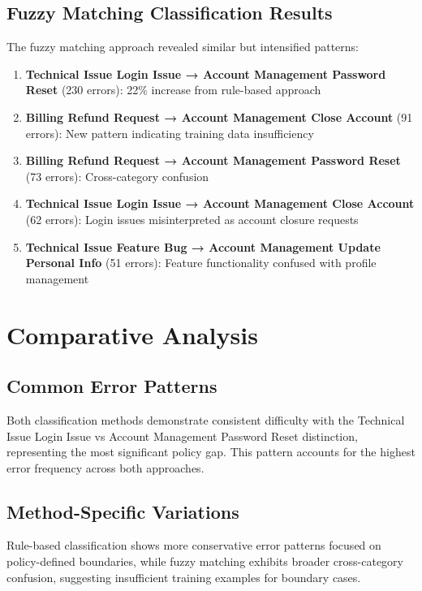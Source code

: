 \documentclass[11pt, a4paper]{article}
\begin{document}
\subsection{Fuzzy Matching Classification Results}

The fuzzy matching approach revealed similar but intensified patterns:

\begin{enumerate}
\item \textbf{Technical Issue Login Issue → Account Management Password Reset} (230 errors): 22\% increase from rule-based approach
\item \textbf{Billing Refund Request → Account Management Close Account} (91 errors): New pattern indicating training data insufficiency
\item \textbf{Billing Refund Request → Account Management Password Reset} (73 errors): Cross-category confusion
\item \textbf{Technical Issue Login Issue → Account Management Close Account} (62 errors): Login issues misinterpreted as account closure requests
\item \textbf{Technical Issue Feature Bug → Account Management Update Personal Info} (51 errors): Feature functionality confused with profile management
\end{enumerate}

\section{Comparative Analysis}

\subsection{Common Error Patterns}

Both classification methods demonstrate consistent difficulty with the Technical Issue Login Issue vs Account Management Password Reset distinction, representing the most significant policy gap. This pattern accounts for the highest error frequency across both approaches.

\subsection{Method-Specific Variations}

Rule-based classification shows more conservative error patterns focused on policy-defined boundaries, while fuzzy matching exhibits broader cross-category confusion, suggesting insufficient training examples for boundary cases.
\end{document}
